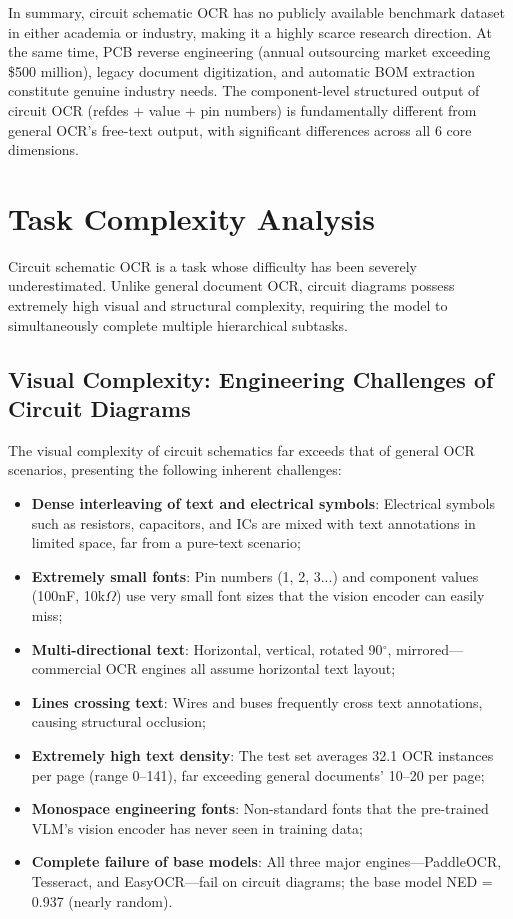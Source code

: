 In summary, circuit schematic OCR has no publicly available benchmark dataset in either academia or industry, making it a highly scarce research direction. At the same time, PCB reverse engineering (annual outsourcing market exceeding \$500 million), legacy document digitization, and automatic BOM extraction constitute genuine industry needs. The component-level structured output of circuit OCR (refdes + value + pin numbers) is fundamentally different from general OCR's free-text output, with significant differences across all 6 core dimensions.

\section{Task Complexity Analysis}

Circuit schematic OCR is a task whose difficulty has been severely underestimated. Unlike general document OCR, circuit diagrams possess extremely high visual and structural complexity, requiring the model to simultaneously complete multiple hierarchical subtasks.

\subsection{Visual Complexity: Engineering Challenges of Circuit Diagrams}

The visual complexity of circuit schematics far exceeds that of general OCR scenarios, presenting the following inherent challenges:

\begin{itemize}[nosep]
    \item \textbf{Dense interleaving of text and electrical symbols}: Electrical symbols such as resistors, capacitors, and ICs are mixed with text annotations in limited space, far from a pure-text scenario;
    \item \textbf{Extremely small fonts}: Pin numbers (1, 2, 3...) and component values (100nF, 10k$\Omega$) use very small font sizes that the vision encoder can easily miss;
    \item \textbf{Multi-directional text}: Horizontal, vertical, rotated 90$^\circ$, mirrored---commercial OCR engines all assume horizontal text layout;
    \item \textbf{Lines crossing text}: Wires and buses frequently cross text annotations, causing structural occlusion;
    \item \textbf{Extremely high text density}: The test set averages 32.1 OCR instances per page (range 0--141), far exceeding general documents' 10--20 per page;
    \item \textbf{Monospace engineering fonts}: Non-standard fonts that the pre-trained VLM's vision encoder has never seen in training data;
    \item \textbf{Complete failure of base models}: All three major engines---PaddleOCR, Tesseract, and EasyOCR---fail on circuit diagrams; the base model NED = 0.937 (nearly random).
\end{itemize}

